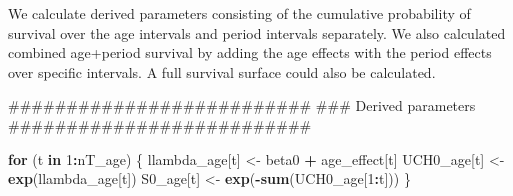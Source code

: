 \documentclass[11pt,]{article}
\newenvironment{Shaded}{\begin{snugshade}}{\end{snugshade}}
\newcommand{\KeywordTok}[1]{\textcolor[rgb]{0.13,0.29,0.53}{\textbf{#1}}}
\newcommand{\DecValTok}[1]{\textcolor[rgb]{0.00,0.00,0.81}{#1}}
\newcommand{\StringTok}[1]{\textcolor[rgb]{0.31,0.60,0.02}{#1}}
\newcommand{\ControlFlowTok}[1]{\textcolor[rgb]{0.13,0.29,0.53}{\textbf{#1}}}
\newcommand{\OperatorTok}[1]{\textcolor[rgb]{0.81,0.36,0.00}{\textbf{#1}}}
\newcommand{\NormalTok}[1]{#1}
\begin{document}
We calculate derived parameters consisting of the cumulative probability
of survival over the age intervals and period intervals separately. We
also calculated combined age+period survival by adding the age effects
with the period effects over specific intervals. A full survival surface
could also be calculated.

\begin{Shaded}
\begin{Highlighting}[]
\NormalTok{  ##########################}
\NormalTok{  ### Derived parameters}
\NormalTok{  ##########################}

  \ControlFlowTok{for}\NormalTok{ (t }\ControlFlowTok{in} \DecValTok{1}\OperatorTok{:}\NormalTok{nT_age) \{}
\NormalTok{    llambda_age[t] <-}\StringTok{ }\NormalTok{beta0 }\OperatorTok{+}\StringTok{ }\NormalTok{age_effect[t]}
\NormalTok{    UCH0_age[t] <-}\StringTok{ }\KeywordTok{exp}\NormalTok{(llambda_age[t])}
\NormalTok{    S0_age[t] <-}\StringTok{ }\KeywordTok{exp}\NormalTok{(}\OperatorTok{-}\KeywordTok{sum}\NormalTok{(UCH0_age[}\DecValTok{1}\OperatorTok{:}\NormalTok{t]))}
\NormalTok{  \}}


\end{Highlighting}
\end{Shaded}
\end{document}
